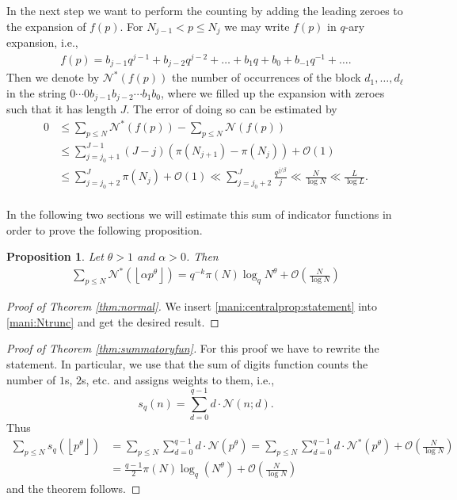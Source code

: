 \documentclass[a4paper,10pt]{amsart}
\newtheorem{prop}[lem]{Proposition}
\numberwithin{equation}{section}
\theoremstyle{definition}
\theoremstyle{remark}
\newcommand{\lf}{\left\lfloor}
\newcommand{\rf}{\right\rfloor}
\begin{document}
In the next step we want to perform the counting by adding the leading zeroes to
the expansion of $f(p)$. For $N_{j-1}<p\leq N_j$ we may write $f(p)$ in $q$-ary
expansion, i.e., 
\begin{gather*}
f(p)=b_{j-1}q^{j-1}+b_{j-2}q^{j-2}+\dots+b_{1}q+b_{0}+b_{-1}q^{-1}+\dots.
\end{gather*}
Then we denote by $\mathcal{N}^*(f(p))$ the number of occurrences of the block
$d_1,\ldots,d_\ell$ in the string $0\cdots0b_{j-1}b_{j-2}\cdots b_1b_0$, where we
filled up the expansion with zeroes such that it has length $J$. The error of
doing so can be estimated by 
\begin{equation}\label{mani:NtoNstar}\begin{split}
0&\leq\sum_{p\leq N}\mathcal{N}^*(f(p))-\sum_{p\leq N}\mathcal{N}(f(p))\\
&\leq\sum_{j=j_0+1}^{J-1}(J-j)\left(\pi(N_{j+1})-\pi(N_{j})\right)+\mathcal{O}(1)\\
&\leq\sum_{j=j_0+2}^{J}\pi(N_{j})+\mathcal{O}(1)\ll\sum_{j=j_0+2}^{J}\frac{q^{j/\beta}}j
\ll\frac N{\log N}\ll\frac L{\log L}.\\
\end{split}\end{equation}

In the following two sections we will estimate this sum of indicator functions
in order to prove the following proposition.
\begin{prop}\label{mani:centralprop}
Let $\theta>1$ and $\alpha>0$. Then
\begin{gather}\label{mani:centralprop:statement}
\sum_{p\leq
  N}\mathcal{N}^*\left(\lf \alpha p^\theta\rf\right)=q^{-k}\pi(N)\log_qN^\theta+\mathcal{O}\left(\frac{N}{\log
  N}\right)
\end{gather}
\end{prop}

\begin{proof}[Proof of Theorem \ref{thm:normal}]
We insert \eqref{mani:centralprop:statement} into \eqref{mani:Ntrunc}
and get the desired result.
\end{proof}

\begin{proof}[Proof of Theorem \ref{thm:summatoryfun}]
For this proof we have to rewrite the statement. In particular, we use that the
sum of digits function counts the number of $1$s, $2$s, etc. and
assigns weights to them, i.e.,
\[
s_q(n)=\sum_{d=0}^{q-1}d\cdot\mathcal{N}(n;d).
\]
Thus
\begin{align*}
\sum_{p\leq N}s_q(\lf p^\theta\rf)
&=\sum_{p\leq N}\sum_{d=0}^{q-1}d\cdot\mathcal{N}(p^\theta)
=\sum_{p\leq
  N}\sum_{d=0}^{q-1}d\cdot\mathcal{N}^*(p^\theta)+\mathcal{O}\left(\frac{N}{\log
    N}\right)\\
&=\frac{q-1}2\pi(N)\log_q(N^\theta)+\mathcal{O}\left(\frac{N}{\log
    N}\right)
\end{align*}
and the theorem follows.
\end{proof}
\end{document}
